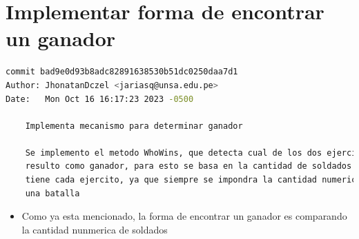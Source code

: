 \section{Implementar forma de encontrar un ganador}
\begin{lstlisting}[language=bash, caption={Commit principal}]
commit bad9e0d93b8adc82891638530b51dc0250daa7d1
Author: JhonatanDczel <jariasq@unsa.edu.pe>
Date:   Mon Oct 16 16:17:23 2023 -0500

    Implementa mecanismo para determinar ganador

    Se implemento el metodo WhoWins, que detecta cual de los dos ejercitos
    resulto como ganador, para esto se basa en la cantidad de soldados que
    tiene cada ejercito, ya que siempre se impondra la cantidad numerica en
    una batalla
\end{lstlisting}
\begin{itemize}
    \item Como ya esta mencionado, la forma de encontrar un ganador es comparando la cantidad nunmerica de soldados
\end{itemize}

